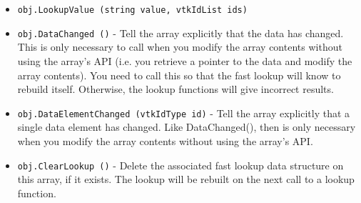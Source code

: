 \begin{itemize}
\item  \verb|obj.LookupValue (string value, vtkIdList ids)|

\item  \verb|obj.DataChanged ()| -  Tell the array explicitly that the data has changed.
 This is only necessary to call when you modify the array contents
 without using the array's API (i.e. you retrieve a pointer to the
 data and modify the array contents).  You need to call this so that
 the fast lookup will know to rebuild itself.  Otherwise, the lookup
 functions will give incorrect results.

\item  \verb|obj.DataElementChanged (vtkIdType id)| -  Tell the array explicitly that a single data element has
 changed. Like DataChanged(), then is only necessary when you
 modify the array contents without using the array's API. 

\item  \verb|obj.ClearLookup ()| -  Delete the associated fast lookup data structure on this array,
 if it exists.  The lookup will be rebuilt on the next call to a lookup
 function.

\end{itemize}
